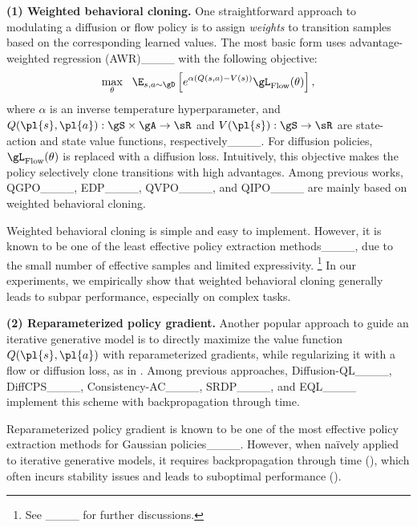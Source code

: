 %
%
%
%
%
%

%
%
%
%
%
%
%
%

%

\textbf{(1) Weighted behavioral cloning.}
One straightforward approach to modulating a diffusion or flow policy is
to assign \emph{weights} to transition samples based on the corresponding learned values. 
The most basic form uses advantage-weighted regression (AWR)____
with the following objective:
\begin{align}
    \max_\theta \ \ \E_{s, a \sim \gD}\left[e^{\alpha(Q(s, a) - V(s))} \gL_\mathrm{Flow}(\theta)\right],
    \label{eq:flow_awr}
\end{align}
where $\alpha$ is an inverse temperature hyperparameter,
and $Q(\pl{s}, \pl{a}): \gS \times \gA \to \sR$ and $V(\pl{s}): \gS \to \sR$ are
state-action and state value functions, respectively____.
For diffusion policies, $\gL_\mathrm{Flow}(\theta)$ is replaced with a diffusion loss.
Intuitively, this objective makes the policy selectively clone transitions with high advantages.
Among previous works, 
QGPO____,
EDP____,
QVPO____,
and QIPO____ are mainly based on weighted behavioral cloning.

Weighted behavioral cloning is simple and easy to implement.
However, it is known to be one of the least effective policy extraction methods____,
due to the small number of effective samples and limited expressivity.%
%
\footnote{See ____ for further discussions.}
In our experiments, we empirically show that weighted behavioral cloning
generally leads to subpar performance, especially on complex tasks.

%
%
%


\textbf{(2) Reparameterized policy gradient.}
Another popular approach to guide an iterative generative model is
to directly maximize the value function $Q(\pl{s}, \pl{a})$ with reparameterized gradients,
while regularizing it with a flow or diffusion loss,
as in .
Among previous approaches,
Diffusion-QL____,
DiffCPS____,
Consistency-AC____,
SRDP____,
and EQL____
implement this scheme with backpropagation through time.

Reparameterized policy gradient is known to be one of the most effective policy extraction methods for Gaussian policies____.
However, when na\"ively applied to iterative generative models,
it requires backpropagation through time (),
which often incurs stability issues %
and leads to suboptimal performance ().

%
%
%
%
%
%
%
%
%
%
%
%
%
%
%
%
%
%
%
%
%

